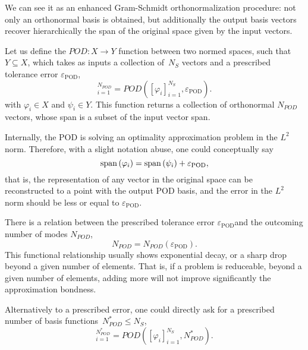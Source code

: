 \documentclass[../../1_heat_equation.tex]{subfiles}
\newcommand{\epspod}{\ensuremath{\varepsilon_\text{POD}}}
\begin{document}
We can see it as an enhanced Gram-Schmidt orthonormalization procedure: not only an orthonormal basis is obtained, but additionally the output basis vectors recover hierarchically the span of the original space given by the input vectors.

Let us define the $POD: X \rightarrow Y$ function between two normed spaces, 
such that $Y \subseteq  X$, 
which takes as inputs a collection of~$N_S$ vectors and a prescribed tolerance error $\epspod$,
\begin{equation}
    [\psi_i]_{i=1}^{N_{POD}} = POD\left([\varphi_i]_{i=1}^{N_S}, \epspod\right).
\end{equation}
with $\varphi_i \in X$ and $\psi_i \in Y$.
This function returns a collection of orthonormal $N_{POD}$ vectors, whose span is a subset of the input vector span.

Internally, the POD is solving an optimality approximation problem in the $L^2$ norm. 
Therefore, with a slight notation abuse, one could conceptually say
\begin{equation}
    \spn{\varphi_i} = \spn{\psi_i} + \epspod,
\end{equation}
that is, the representation of any vector in the original space can be reconstructed to a point with the output POD basis, 
and the error in the $L^2$ norm should be less or equal to \epspod.

There is a relation between the prescribed tolerance error \epspod and the outcoming number of modes $N_{POD}$, 
\begin{equation}
    N_{POD} = N_{POD}(\epspod).
\end{equation}
This functional relationship usually shows exponential decay, or a sharp drop beyond a given number of elements.
That is, if a problem is reduceable, beyond a given number of elements, adding more will not improve significantly the approximation bondness. 

Alternatively to a prescribed error, one could directly ask for a prescribed number of basis functions~$N^{*}_{POD} \leq N_S$,
\begin{equation}
    [\psi_i]_{i=1}^{N^{*}_{POD}} = POD\left([\varphi_i]_{i=1}^{N_S}, N^{*}_{POD}\right).
\end{equation}
\end{document}
